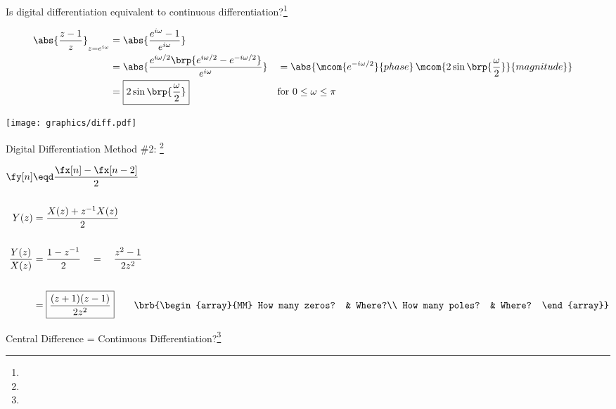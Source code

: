  
Is digital differentiation equivalent to continuous differentiation?\footnote{}
 
\begin{align*}
  \abs{\frac{z-1}{z}}_{z=e^{i\omega}}
    &= \abs{\frac{e^{i\omega}-1}
                 {e^{i\omega}}
           }
  \\&= \abs{\frac{e^{i\omega/2}\brp{e^{i\omega/2}-e^{-i\omega/2}}}
                 {e^{i\omega}}
           }
   &&= \abs{\mcom{e^{-i\omega/2}}{phase}\,\mcom{{2\sin\brp{\frac{\omega}{2}}}}{magnitude}}
  \\&= \boxed{{2\sin\brp{\frac{\omega}{2}}}} 
    && \text{for $0\le\omega\le\pi$}
\end{align*}


\texttt{[image: graphics/diff.pdf]}


Digital Differentiation Method \#2: \footnote{}
 
\begin{align*}
  \fy[n]
    &\eqd \frac{\fx[n] - \fx[n-2]}{2}
  \\\\
  Y(z) &= \frac{X(z) + z^{-1}X(z)}{2}
  \\\\
  \frac{Y(z)}{X(z)} &= \frac{1-z^{-1}}{2} \quad=\quad {\frac{z^2-1}{2z^2}}
  \\\\
                    &= \boxed{\frac{(z+1)(z-1)}{2z^2}} 
  \qquad\brb{\begin{array}{MM}
    How many zeros? & Where?\\
    How many poles? & Where?
  \end{array}}
\end{align*}


 
Central Difference = Continuous Differentiation?\footnote{}
 
